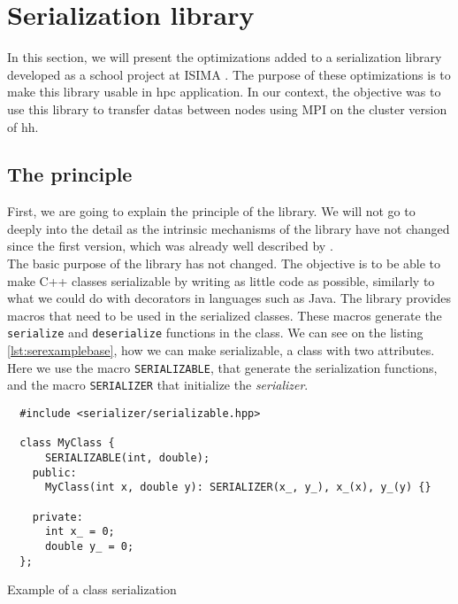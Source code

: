 
\clearpage{}
\section{Serialization library}

In this section, we will present the optimizations added to a serialization
library developed as a school project at ISIMA \cite{projectzz3isima}. The purpose
of these optimizations is to make this library usable in \gls{hpc} application.
In our context, the objective was to use this library to transfer datas between
nodes using MPI on the cluster version of \gls{hh}.

\subsection{The principle}

First, we are going to explain the principle of the library. We will not go to
deeply into the detail as the intrinsic mechanisms of the library have not changed
since the first version, which was already well described by
\cite{projectzz3isima}.\\

The basic purpose of the library has not changed. The objective is to be able to
make C++ classes serializable by writing as little code as possible, similarly
to what we could do with decorators in languages such as Java. The library
provides macros that need to be used in the serialized classes. These macros
generate the \texttt{serialize} and \texttt{deserialize} functions in the class.
We can see on the listing \ref{lst:serexamplebase}, how we can make
serializable, a class with two attributes. Here we use the macro
\texttt{SERIALIZABLE}, that generate the serialization functions, and the macro
\texttt{SERIALIZER} that initialize the \textit{serializer}.

\begin{listing}[ht!]
\begin{verbatim}
  #include <serializer/serializable.hpp>

  class MyClass {
      SERIALIZABLE(int, double);
    public:
      MyClass(int x, double y): SERIALIZER(x_, y_), x_(x), y_(y) {}

    private:
      int x_ = 0;
      double y_ = 0;
  };
\end{verbatim}
\caption{Example of a class serialization}
\label{lst:serexamplebase}
\end{listing}

